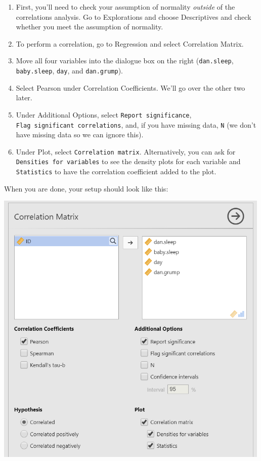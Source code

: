 \documentclass[
]{book}
\begin{document}
\begin{enumerate}
\def\labelenumi{\arabic{enumi}.}
\item
  First, you'll need to check your assumption of normality \emph{outside} of the correlations analysis. Go to Explorations and choose Descriptives and check whether you meet the assumption of normality.
\item
  To perform a correlation, go to Regression and select Correlation Matrix.
\item
  Move all four variables into the dialogue box on the right (\texttt{dan.sleep}, \texttt{baby.sleep}, \texttt{day}, and \texttt{dan.grump}).
\item
  Select Pearson under Correlation Coefficients. We'll go over the other two later.
\item
  Under Additional Options, select \texttt{Report\ significance}, \texttt{Flag\ significant\ correlations}, and, if you have missing data, \texttt{N} (we don't have missing data so we can ignore this).
\item
  Under Plot, select \texttt{Correlation\ matrix}. Alternatively, you can ask for \texttt{Densities\ for\ variables} to see the density plots for each variable and \texttt{Statistics} to have the correlation coefficient added to the plot.
\end{enumerate}

When you are done, your setup should look like this:

\includegraphics[width=5.20833in,height=\textheight]{images/08-correlation/correlation-setup.png}
\end{document}

